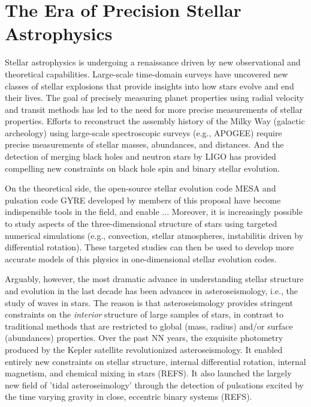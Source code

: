 \section{The Era of Precision Stellar Astrophysics}

Stellar astrophysics is undergoing a renaissance driven by new observational and theoretical capabilities. Large-scale time-domain surveys have uncovered new classes of stellar explosions that provide insights into how stars evolve and end their lives.  The goal of precisely measuring planet properties using radial velocity and transit methods has led to the need for more precise measurements of stellar properties.  Efforts to reconstruct the assembly history of the Milky Way (galactic archeology) using large-scale spectroscopic surveys (e.g., APOGEE) require precise measurements of stellar masses, abundances, and distances.   And the detection of merging black holes and neutron stars by LIGO has provided compelling new constraints on black hole spin and binary stellar evolution.   

On the theoretical side, the open-source stellar evolution code MESA and pulsation code GYRE developed by members of this proposal have become indispensible tools in the field, and enable  ...   Moreover, it is increasingly possible to study aspects of the three-dimensional structure of stars using targeted numerical simulations (e.g., convection, stellar atmospheres, instabilitis driven by differential rotation).  These targeted studies can then be used to develop more accurate models of this physics in one-dimensional stellar evolution codes.

Arguably, however, the most dramatic advance in understanding stellar structure and evolution in the last decade has been advances in asteroseismology, i.e., the study of waves in stars.   The reason is that asteroseismology provides stringent constraints on the {\em interior} structure of large samples of stars, in contrast to traditional methods that are restricted to global (mass, radius) and/or surface (abundances) properties.   Over the past NN years, the exquisite photometry produced by the Kepler satellite revolutionized asteroseismology.  It enabled entirely new constraints on stellar structure, internal differential rotation, internal magnetism, and chemical mixing in stars (REFS).  It also launched the largely new field of 'tidal asteroseimology' through the detection of pulsations excited by the time varying gravity in close, eccentric binary systems (REFS). 

